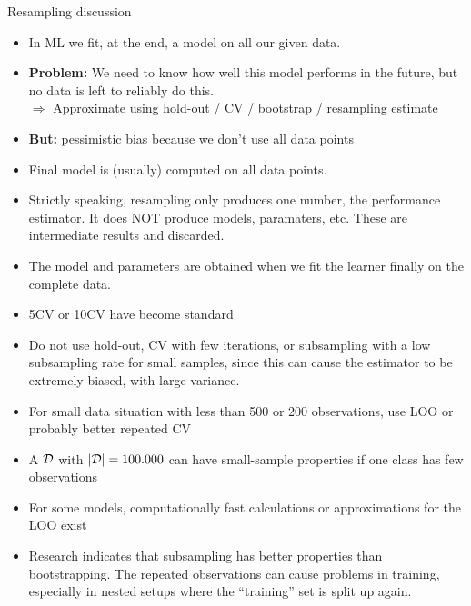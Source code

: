 \documentclass[11pt,compress,t,notes=noshow, xcolor=table]{beamer}
\begin{document}
\begin{vbframe}{Resampling discussion}

\begin{itemize}
 \item In ML we fit, at the end, a model on all our given data.\\

 \item \textbf{Problem:} We need to know how well this model performs in the future, but no data is left to reliably do this.\\
$\Rightarrow$ Approximate using hold-out / CV / bootstrap / resampling estimate\\ 

 \item \textbf{But:} pessimistic bias because we don't use all data points\\

 \item Final model is (usually) computed on all data points.

 \item Strictly speaking, resampling only produces one number, the performance estimator.
  It does NOT produce models, paramaters, etc. These are intermediate results and discarded.
  
  \item The model and parameters are obtained when we fit the learner finally on the complete data.

\end{itemize}

\framebreak

\begin{itemize}
  \item 5CV or 10CV have become standard
  \item Do not use hold-out, CV with few iterations, or subsampling with a low subsampling rate for small samples, since this can cause the estimator to be extremely biased, with large variance.
  \item For small data situation with less than 500 or 200 observations, use LOO or probably better repeated CV
  \item A $\mathcal{D}$ with $|\mathcal{D}| = 100.000$ can have small-sample properties if one class has few observations 
   \item For some models, computationally fast calculations or approximations for the LOO exist
  \item Research indicates that subsampling has better properties than
    bootstrapping. The repeated observations can cause problems in training,
    especially in nested setups where the \enquote{training} set is split up again.
\end{itemize}
\end{vbframe}

\endlecture
\end{document}
